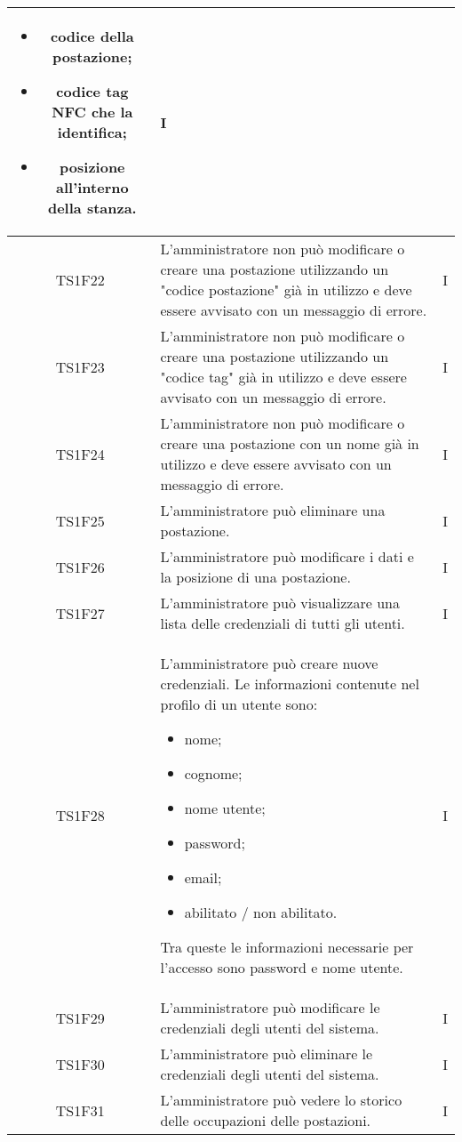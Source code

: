 \begin{center}
\begin{longtable}{|c|p{10cm}|c|}
			\begin{itemize}
				\item codice della postazione;
				\item codice tag NFC che la identifica;
				\item posizione all'interno della stanza.
			\end{itemize}
			& I \\					
			\hline				
			TS1F22 & L'amministratore non può modificare o creare una postazione utilizzando un "codice postazione" già in utilizzo e deve essere avvisato con un messaggio di errore. & I \\			
			\hline			
			TS1F23 & L'amministratore non può modificare o creare una postazione utilizzando un "codice tag" già in utilizzo e deve essere avvisato con un messaggio di errore. & I \\			
			\hline			
			TS1F24 & L'amministratore non può modificare o creare una postazione con un nome già in utilizzo e deve essere avvisato con un messaggio di errore. & I \\			
			\hline
			TS1F25 & L'amministratore può eliminare una postazione. & I \\	
			\hline	
			TS1F26 & L'amministratore può modificare i dati e la posizione di una postazione. & I \\			
			\hline	
			TS1F27 & L'amministratore può visualizzare una lista delle credenziali di tutti gli utenti. & I \\	
			\hline
			TS1F28 & L'amministratore può creare nuove credenziali. Le informazioni contenute nel profilo di un utente sono:
			\begin{itemize}
				\item nome;
				\item cognome;
				\item nome utente;
				\item password;
				\item email;
				\item abilitato / non abilitato.
			\end{itemize}
			Tra queste le informazioni necessarie per l’accesso sono password e nome utente. & I \\	
			\hline
			TS1F29 & L’amministratore può modificare le credenziali degli utenti del sistema. & I \\	
			\hline
			TS1F30 & L’amministratore può eliminare le credenziali degli utenti del sistema. & I \\	
			\hline
			TS1F31 & L'amministratore può vedere lo storico delle occupazioni delle postazioni. & I \\	

\end{longtable}
\end{center}
